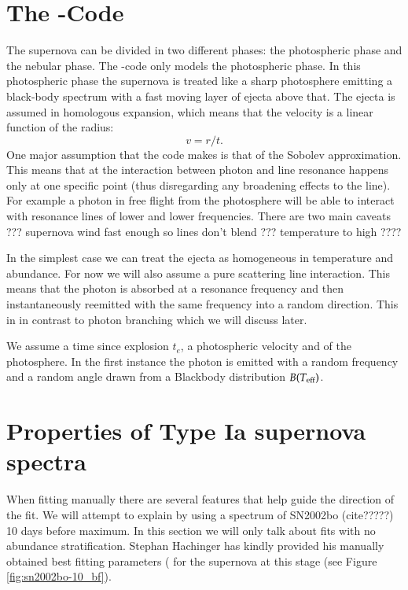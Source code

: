 \section{The \mlc-Code}

The supernova can be divided in two different phases: the photospheric phase and the nebular phase. The \mlc-code only models the photospheric phase.
In this photospheric phase the supernova is treated like a sharp photosphere emitting a black-body spectrum with a fast moving layer of ejecta above that. The ejecta is assumed in homologous expansion, which means that the velocity is a linear function of the radius:
\[
	v=  r / t.
\]
One major assumption that the code makes is that of the Sobolev approximation. This means that at the interaction between photon and line resonance happens only at one specific point (thus disregarding any broadening effects to the line). For example a photon in free flight from the photosphere will be able to interact with resonance lines of lower and lower frequencies. 
There are two main caveats ??? supernova wind fast enough so lines don't blend ??? temperature to high ????

In the simplest case we can treat the ejecta as homogeneous in temperature and abundance. For now we will also assume a pure scattering line interaction. This means that the photon is absorbed at a resonance frequency and then instantaneously reemitted with the same frequency into a random direction. This in in contrast to photon branching which we will discuss later. 

We assume a time since explosion $t_e$, a photospheric velocity \vph and \teff of the photosphere. 
In the first instance the photon is emitted with a random frequency and a random angle drawn from a Blackbody distribution $B(T_{\rm eff})$.  



\section{Properties of Type Ia supernova spectra}

When fitting manually there are several features that help guide the direction of the fit. We will attempt to explain by using a spectrum of SN2002bo (cite?????) 10 days before maximum. In this section we will only talk about fits with no abundance stratification. Stephan Hachinger has kindly provided his manually obtained best fitting parameters ( for the supernova at this stage (see Figure \ref{fig:sn2002bo-10_bf}).

